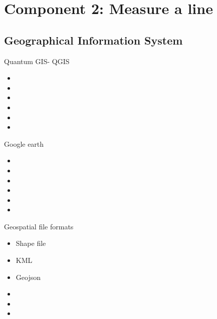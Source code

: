 \section[Component 2]{Component 2: Measure a line}
\subsection[Geographical Information System]{Geographical Information System}
\begin{frame}{Quantum GIS- QGIS}
\begin{beamerboxesrounded}{}
	\begin{itemize}
		\item
		\item 
		\item 
		\item 
		\item 
		\item 
\end{itemize}
\end{beamerboxesrounded}
\end{frame}


\begin{frame}{Google earth}
	\begin{beamerboxesrounded}{}
		\begin{itemize}
			\item
			\item 
			\item 
			\item 
			\item 
			\item 
		\end{itemize}
	\end{beamerboxesrounded}
\end{frame}


\begin{frame}{Geospatial file formats}
	\begin{beamerboxesrounded}{}
		\begin{itemize}
			\item Shape file
			\item KML
			\item Geojson
			\item 
			\item 
			\item 
		\end{itemize}
	\end{beamerboxesrounded}
\end{frame}


